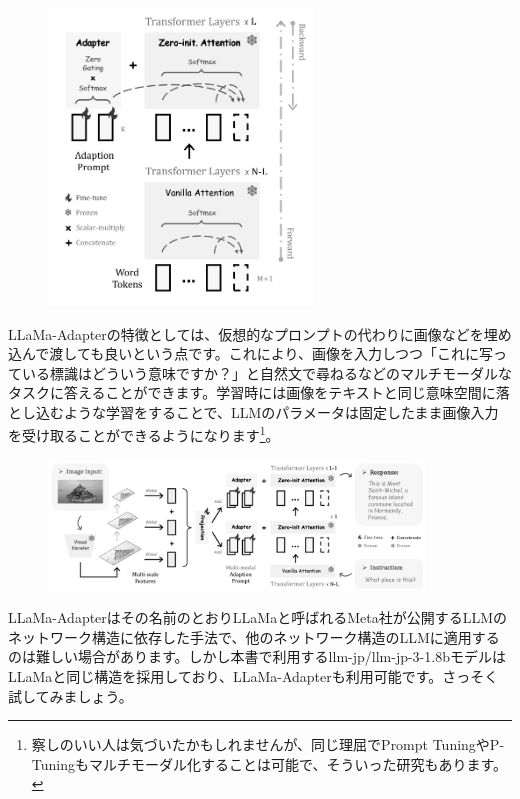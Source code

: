 \documentclass[a5paper,twoside,dvipdfmx]{jsarticle}
\begin{document}
\begin{figure}[h]
  \centering
  \includegraphics[width=70mm]{../C105Fig/gray/llama_adapter_image.png}
 \end{figure} 

 \newpage

LLaMa-Adapterの特徴としては、仮想的なプロンプトの代わりに画像などを埋め込んで渡しても良いという点です。これにより、画像を入力しつつ「これに写っている標識はどういう意味ですか？」と自然文で尋ねるなどのマルチモーダルなタスクに答えることができます。学習時には画像をテキストと同じ意味空間に落とし込むような学習をすることで、LLMのパラメータは固定したまま画像入力を受け取ることができるようになります\footnote{察しのいい人は気づいたかもしれませんが、同じ理屈でPrompt TuningやP-Tuningもマルチモーダル化することは可能で、そういった研究もあります。}。


\begin{figure}[h]
  \centering
  \includegraphics[width=100mm]{../C105Fig/gray/llama_adapter_image2.png}
 \end{figure} 

LLaMa-Adapterはその名前のとおりLLaMaと呼ばれるMeta社が公開するLLMのネットワーク構造に依存した手法で、他のネットワーク構造のLLMに適用するのは難しい場合があります。しかし本書で利用するllm-jp/llm-jp-3-1.8bモデルはLLaMaと同じ構造を採用しており、LLaMa-Adapterも利用可能です。さっそく試してみましょう。
\end{document}
